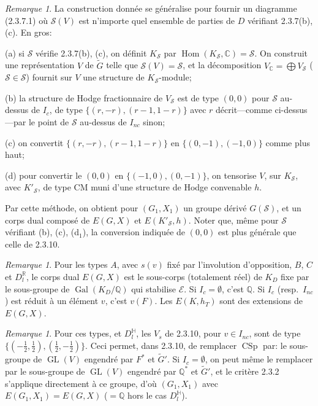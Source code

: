 \documentclass[12pt,a4paper]{article}
\theoremstyle{plain}
\theoremstyle{definition}
\theoremstyle{remark}
\newtheorem{remark}[theorem]{Remarque}
\DeclareMathOperator{\Hom}{Hom}
\DeclareMathOperator{\GL}{GL}
\DeclareMathOperator{\CSp}{CSp}
\DeclareMathOperator{\Gal}{Gal}
\newcommand{\QQ}{\mathbb{Q}}
\newcommand{\RR}{\mathbb{R}}
\newcommand{\CC}{\mathbb{C}}
\begin{document}
\begin{remark}
La construction donn\'ee se g\'en\'eralise pour fournir un diagramme (2.3.7.1) o\`u $\mathcal{S}(V)$ est n'importe quel ensemble de parties de $D$ v\'erifiant 2.3.7(b), (c). En gros:

(a) si $\mathcal{S}$ v\'erifie 2.3.7(b), (c), on d\'efinit $K_\mathcal{S}$ par $\Hom(K_\mathcal{S},\CC) = \mathcal{S}$. On construit une repr\'esentation $V$ de $\tilde{G}$ telle que $\mathcal{S}(V) = \mathcal{S}$, et la d\'ecomposition $V_{\CC} = \bigoplus V_\mathcal{S}$ ($\mathcal{S} \in \mathcal{S}$) fournit sur $V$ une structure de $K_\mathcal{S}$-module;

(b) la structure de Hodge fractionnaire de $V_\mathcal{S}$ est de type $(0,0)$ pour $\mathcal{S}$ au-dessus de $I_c$, de type $\{(r,-r),(r-1,1-r)\}$ avec $r$ d\'ecrit---comme ci-dessus---par le point de $\mathcal{S}$ au-dessus de $I_{nc}$ sinon;

(c) on convertit $\{(r,-r),(r-1,1-r)\}$ en $\{(0,-1),(-1,0)\}$ comme plus haut;

(d) pour convertir le $(0,0)$ en $\{(-1,0),(0,-1)\}$, on tensorise $V$, sur $K_\mathcal{S}$, avec $K'_\mathcal{S}$, de type CM muni d'une structure de Hodge convenable $h$.

Par cette m\'ethode, on obtient pour $(G_1,X_1)$ un groupe d\'eriv\'e $G(\mathcal{S})$, et un corps dual compos\'e de $E(G,X)$ et $E(K'_\mathcal{S},h)$. Noter que, m\^eme pour $\mathcal{S}$ v\'erifiant (b), (c), (d$_1$), la conversion indiqu\'ee de $(0,0)$ est plus g\'en\'erale que celle de 2.3.10.
\end{remark}

\begin{remark}
Pour les types $A$, avec $s(v)$ fix\'e par l'involution d'opposition, $B$, $C$ et $D_l^{\RR}$, le corps dual $E(G,X)$ est le sous-corps (totalement r\'eel) de $K_D$ fixe par le sous-groupe de $\Gal(K_D/\QQ)$ qui stabilise $\mathcal{E}$. Si $I_c = \emptyset$, c'est $\QQ$. Si $I_c$ (resp.~$I_{nc}$) est r\'eduit \`a un \'el\'ement $v$, c'est $v(F)$. Les $E(K,h_T)$ sont des extensions de $E(G,X)$.
\end{remark}

\begin{remark}
Pour ces types, et $D_l^{\mathbb{H}}$, les $V_s$ de 2.3.10, pour $v \in I_{nc}$, sont de type $\{(-\frac{1}{2},\frac{1}{2}), (\frac{1}{2},-\frac{1}{2})\}$. Ceci permet, dans 2.3.10, de remplacer $\CSp$ par: le sous-groupe de $\GL(V)$ engendr\'e par $F^*$ et $\tilde{G}'$. Si $I_c = \emptyset$, on peut m\^eme le remplacer par le sous-groupe de $\GL(V)$ engendr\'e par $\QQ^*$ et $\tilde{G}'$, et le crit\`ere 2.3.2 s'applique directement \`a ce groupe, d'o\`u $(G_1,X_1)$ avec $E(G_1,X_1) = E(G,X)$ ($= \QQ$ hors le cas $D_l^{\mathbb{H}}$).
\end{remark}
\end{document}
